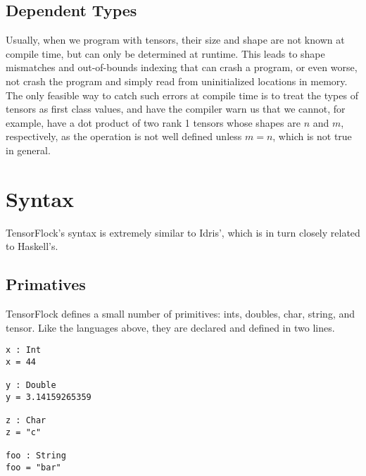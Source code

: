 \documentclass[12pt]{article}
\begin{document}
\subsection{Dependent Types}
Usually, when we program with tensors, their size and shape are not known at
compile time, but can only be determined at runtime. This leads to shape
mismatches and out-of-bounds indexing that can crash a program, or even worse, not crash the program and simply read from uninitialized locations in memory. The only feasible way to catch such errors at compile time is to treat the types of tensors as first class values, and have the compiler warn us that we cannot, for example, have a dot product of two rank 1 tensors whose shapes are $n$ and $m$, respectively, as the operation is not well defined unless $m=n$, which is not true in general. 
\section{Syntax}
TensorFlock's syntax is extremely similar to Idris', which is in turn closely related to Haskell's.

\subsection{Primatives}
TensorFlock defines a small number of primitives: ints, doubles, char, string, and tensor. Like the languages above, they are declared and defined in two lines.
\begin{lstlisting}
x : Int
x = 44

y : Double
y = 3.14159265359

z : Char
z = "c"

foo : String
foo = "bar"
\end{lstlisting}
\end{document}

